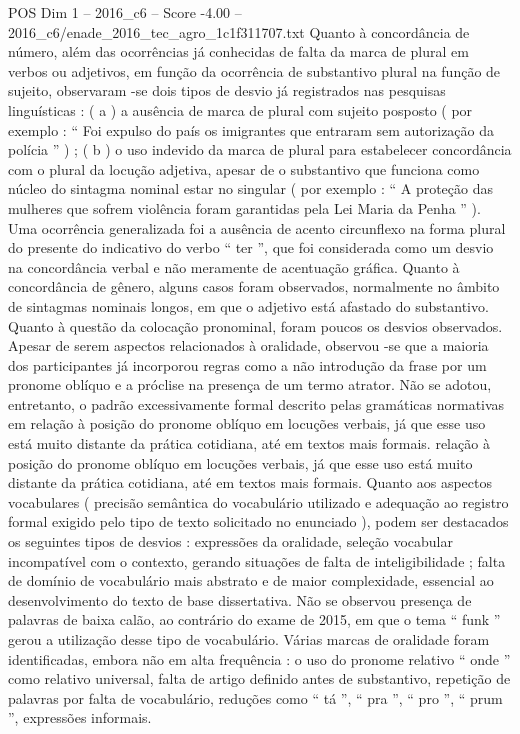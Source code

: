 \begin{textsample}{POS Dim 1 – 2016\_c6 – Score -4.00 – 2016\_c6/enade\_2016\_tec\_agro\_1c1f311707.txt}
Quanto à concordância de número, além das ocorrências já conhecidas de falta da marca de plural em verbos ou adjetivos, em função da ocorrência de substantivo plural na função de sujeito, observaram -se dois tipos de desvio já registrados nas pesquisas linguísticas : ( a ) a ausência de marca de plural com sujeito posposto ( por exemplo : “ Foi expulso do país os imigrantes que entraram sem autorização da polícia ” ) ; ( b ) o uso indevido da marca de plural para estabelecer concordância com o plural da locução adjetiva, apesar de o substantivo que funciona como núcleo do sintagma nominal estar no singular ( por exemplo : “ A proteção das mulheres que sofrem violência foram garantidas pela Lei Maria da Penha ” ).
Uma ocorrência generalizada foi a ausência de acento circunflexo na forma plural do presente do indicativo do verbo “ ter ”, que foi considerada como um desvio na concordância verbal e não meramente de acentuação gráfica.
Quanto à concordância de gênero, alguns casos foram observados, normalmente no âmbito de sintagmas nominais longos, em que o adjetivo está afastado do substantivo.
Quanto à questão da colocação pronominal, foram poucos os desvios observados.
Apesar de serem aspectos relacionados à oralidade, observou -se que a maioria dos participantes já incorporou regras como a não introdução da frase por um pronome oblíquo e a próclise na presença de um termo atrator.
Não se adotou, entretanto, o padrão excessivamente formal descrito pelas gramáticas normativas em relação à posição do pronome oblíquo em locuções verbais, já que esse uso está muito distante da prática cotidiana, até em textos mais formais. relação à posição do pronome oblíquo em locuções verbais, já que esse uso está muito distante da prática cotidiana, até em textos mais formais.
Quanto aos aspectos vocabulares ( precisão semântica do vocabulário utilizado e adequação ao registro formal exigido pelo tipo de texto solicitado no enunciado ), podem ser destacados os seguintes tipos de desvios : expressões da oralidade, seleção vocabular incompatível com o contexto, gerando situações de falta de inteligibilidade ; falta de domínio de vocabulário mais abstrato e de maior complexidade, essencial ao desenvolvimento do texto de base dissertativa.
Não se observou presença de palavras de baixa calão, ao contrário do exame de 2015, em que o tema “ funk ” gerou a utilização desse tipo de vocabulário.
Várias marcas de oralidade foram identificadas, embora não em alta frequência : o uso do pronome relativo “ onde ” como relativo universal, falta de artigo definido antes de substantivo, repetição de palavras por falta de vocabulário, reduções como “ tá ”, “ pra ”, “ pro ”, “ prum ”, expressões informais.

\end{textsample}
